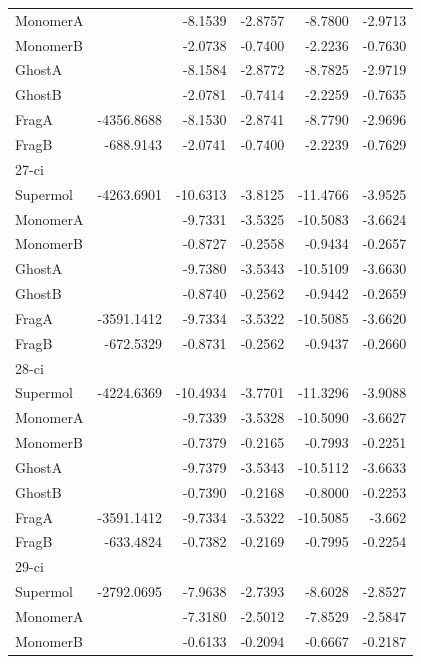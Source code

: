 \documentclass[journal=jctcce,manuscript=article]{achemso}
\begin{document}
\begin{spacing}{1}
\begin{longtable}{lRRRRR}
    MonomerA &       & -8.1539 & -2.8757 & -8.7800 & -2.9713 \\
    MonomerB &       & -2.0738 & -0.7400 & -2.2236 & -0.7630 \\
    GhostA &       & -8.1584 & -2.8772 & -8.7825 & -2.9719 \\
    GhostB &       & -2.0781 & -0.7414 & -2.2259 & -0.7635 \\
    FragA & -4356.8688 & -8.1530 & -2.8741 & -8.7790 & -2.9696 \\
    FragB & -688.9143 & -2.0741 & -0.7400 & -2.2239 & -0.7629 \\
    27-ci &       &       &       &       &  \\
    Supermol & -4263.6901 & -10.6313 & -3.8125 & -11.4766 & -3.9525 \\
    MonomerA &       & -9.7331 & -3.5325 & -10.5083 & -3.6624 \\
    MonomerB &       & -0.8727 & -0.2558 & -0.9434 & -0.2657 \\
    GhostA &       & -9.7380 & -3.5343 & -10.5109 & -3.6630 \\
    GhostB &       & -0.8740 & -0.2562 & -0.9442 & -0.2659 \\
    FragA & -3591.1412 & -9.7334 & -3.5322 & -10.5085 & -3.6620 \\
    FragB & -672.5329 & -0.8731 & -0.2562 & -0.9437 & -0.2660 \\
    28-ci &       &       &       &       &  \\
    Supermol & -4224.6369 & -10.4934 & -3.7701 & -11.3296 & -3.9088 \\
    MonomerA &       & -9.7339 & -3.5328 & -10.5090 & -3.6627 \\
    MonomerB &       & -0.7379 & -0.2165 & -0.7993 & -0.2251 \\
    GhostA &       & -9.7379 & -3.5343 & -10.5112 & -3.6633 \\
    GhostB &       & -0.7390 & -0.2168 & -0.8000  & -0.2253 \\
    FragA & -3591.1412 & -9.7334 & -3.5322 & -10.5085 & -3.662 \\
    FragB & -633.4824 & -0.7382 & -0.2169 & -0.7995 & -0.2254 \\
    29-ci &       &       &       &       &  \\
    Supermol & -2792.0695 & -7.9638 & -2.7393 & -8.6028 & -2.8527 \\
    MonomerA &       & -7.3180 & -2.5012 & -7.8529 & -2.5847 \\
    MonomerB &       & -0.6133 & -0.2094 & -0.6667 & -0.2187 \\

\end{longtable}
\end{spacing}
\end{document}
